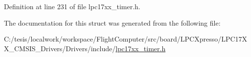 \-Definition at line 231 of file lpc17xx\-\_\-timer.\-h.



\-The documentation for this struct was generated from the following file\-:\begin{DoxyCompactItemize}
\item 
\-C\-:/tesis/localwork/workspace/\-Flight\-Computer/src/board/\-L\-P\-C\-Xpresso/\-L\-P\-C17\-X\-X\-\_\-\-C\-M\-S\-I\-S\-\_\-\-Drivers/\-Drivers/include/\hyperlink{lpc17xx__timer_8h}{lpc17xx\-\_\-timer.\-h}\end{DoxyCompactItemize}
